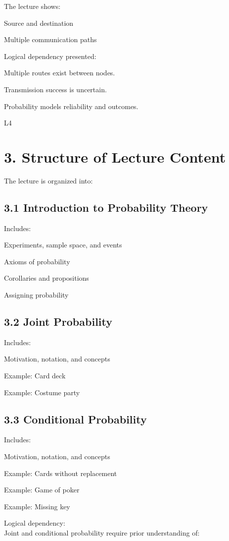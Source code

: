 \documentclass[12pt]{article}
\begin{document}
The lecture shows:

Source and destination

Multiple communication paths

Logical dependency presented:

Multiple routes exist between nodes.

Transmission success is uncertain.

Probability models reliability and outcomes. 

L4

\section*{3. Structure of Lecture Content}

The lecture is organized into:

\subsection*{3.1 Introduction to Probability Theory}

Includes:

Experiments, sample space, and events

Axioms of probability

Corollaries and propositions

Assigning probability

\subsection*{3.2 Joint Probability}

Includes:

Motivation, notation, and concepts

Example: Card deck

Example: Costume party

\subsection*{3.3 Conditional Probability}

Includes:

Motivation, notation, and concepts

Example: Cards without replacement

Example: Game of poker

Example: Missing key

Logical dependency: \\
Joint and conditional probability require prior understanding of:
\end{document}
